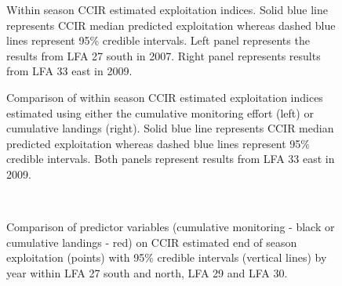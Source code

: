 \documentclass[11pt]{article}
\newcommand{\D}{.}
\newcommand{\e}{/SpinDr/backup/bio_data/bio.lobster/figures/} %
\begin{document}
\begin{figure}
\centering
             \caption{Within season CCIR estimated exploitation indices. Solid blue line represents CCIR median predicted exploitation whereas dashed blue lines represent 95\% credible intervals. Left panel represents the results from LFA 27 south in 2007. Right panel represents results from LFA 33 east in 2009.}
\end{figure}

\begin{figure}
\centering
             \caption{Comparison of within season CCIR estimated exploitation indices estimated using either the cumulative monitoring effort (left) or cumulative landings (right). Solid blue line represents CCIR median predicted exploitation whereas dashed blue lines represent 95\% credible intervals. Both panels represent results from LFA 33 east in 2009.}
\end{figure}




\begin{figure}
        \centering
         \\
                 \caption{Comparison of predictor variables (cumulative monitoring - black or cumulative landings - red) on CCIR estimated end of season exploitation (points) with 95\% credible intervals (vertical lines) by year within LFA 27 south and north, LFA 29 and LFA 30.}
        \end{figure}
\end{document}
